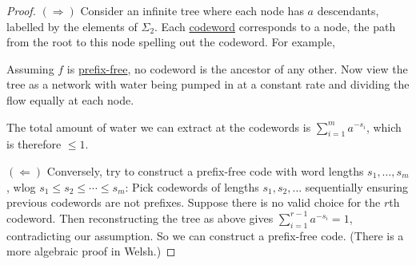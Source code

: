 \documentclass{article}
\newcommand{\1}[1]{\mathbbm{1}_{#1}}
\begin{document}
\begin{proof}
    $(\Rightarrow)$ Consider an infinite tree where each node has $a$ descendants, labelled by the elements of $\Sigma_2$.
    Each \hyperlink{def:code}{codeword} corresponds to a node, the path from the root to this node spelling out the codeword.
    For example,
    \begin{center}
    \end{center}
    Assuming $f$ is \hyperlink{def:prefixFreeCode}{prefix-free}, no codeword is the ancestor of any other. Now view the tree as a network with water being pumped in at a constant rate and dividing the flow equally at each node.

    The total amount of water we can extract at the codewords is $\sum_{i=1}^m a^{-s_i}$, which is therefore $\leq 1$.

    $(\Leftarrow)$ Conversely, try to construct a prefix-free code with word lengths $s_1, \dotsc, s_m$, wlog $s_1 \leq s_2 \leq \dotsb \leq s_m$:
    Pick codewords of lengths $s_1, s_2, \dotsc$ sequentially ensuring previous codewords are not prefixes.
    Suppose there is no valid choice for the $r$th codeword.
    Then reconstructing the tree as above gives $ \sum_{i=1}^{r-1} a^{-s_i} = 1 $, contradicting our assumption.
    So we can construct a prefix-free code. (There is a more algebraic proof in Welsh.)
\end{proof}
\end{document}

